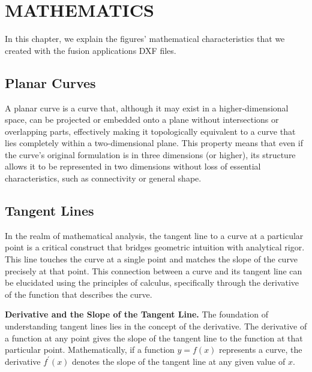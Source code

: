 \chapter{MATHEMATICS}

In this chapter, we explain the figures' mathematical characteristics that we created with the fusion applications DXF files.
\section{Planar Curves}
A planar curve is a curve that, although it may exist in a higher-dimensional space, can be projected or embedded onto a plane without intersections or overlapping parts, effectively making it topologically equivalent to a curve that lies completely within a two-dimensional plane. This property means that even if the curve's original formulation is in three dimensions (or higher), its structure allows it to be represented in two dimensions without loss of essential characteristics, such as connectivity or general shape.
\section{Tangent Lines}
In the realm of mathematical analysis, the tangent line to a curve at a particular point is a critical construct that bridges geometric intuition with analytical rigor. This line touches the curve at a single point and matches the slope of the curve precisely at that point. This connection between a curve and its tangent line can be elucidated using the principles of calculus, specifically through the derivative of the function that describes the curve.

\noindent\textbf{Derivative and the Slope of the Tangent Line.}
The foundation of understanding tangent lines lies in the concept of the derivative. The derivative of a function at any point gives the slope of the tangent line to the function at that particular point. Mathematically, if a function
$y=f(x)$ represents a curve, the derivative
$f^{\prime}(x)$ denotes the slope of the tangent line at any given value of $x$.

